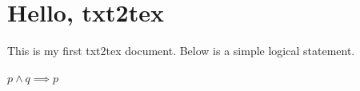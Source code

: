\documentclass[a4paper,10pt,fleqn]{article}
\begin{document}
\section*{Hello, txt2tex}

\noindent This is my first txt2tex document. Below is a simple logical statement.

\bigskip

\noindent
$p \land q \implies p$
\end{document}
